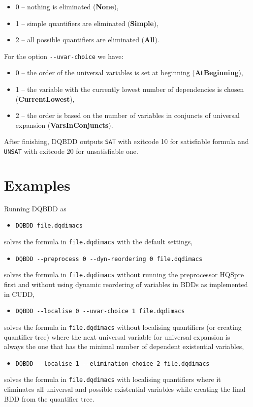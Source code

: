 \documentclass[
  digital, %
  color,
  twoside, %
  table,   %
  nolof,     %
  nolot,     %
]{fithesis3}
\theoremstyle{definition}
\theoremstyle{remark}
\newcommand{\QEnone}{\textbf{None}}
\newcommand{\QEsimple}{\textbf{Simple}}
\newcommand{\QEall}{\textbf{All}}
\newcommand{\QUatbeginning}{\textbf{At\-Be\-gin\-ning}}
\newcommand{\QUcurrentlowest}{\textbf{CurrentLowest}}
\newcommand{\QUvarsinconjuncts}{\textbf{VarsInConjuncts}}
\begin{document}
\begin{itemize}
    \item 0 -- nothing is eliminated (\QEnone{}),
    \item 1 -- simple quantifiers are eliminated (\QEsimple{}),
    \item 2 -- all possible quantifiers are eliminated (\QEall{}).
\end{itemize}
For the option \verb|--uvar-choice| we have:
\begin{itemize}
    \item 0 -- the order of the universal variables is set at beginning (\QUatbeginning{}),
    \item 1 -- the variable with the currently lowest number of dependencies is chosen (\QUcurrentlowest{}),
    \item 2 -- the order is based on the number of variables in conjuncts of universal expansion (\QUvarsinconjuncts{}).
\end{itemize}

After finishing, DQBDD outputs \verb|SAT| with exitcode 10 for satisfiable formula and \verb|UNSAT| with exitcode 20 for unsatisfiable one.

\section{Examples}
Running DQBDD as
\begin{itemize}
  \item \verb|DQBDD file.dqdimacs|
\end{itemize}
solves the formula in \verb|file.dqdimacs| with the default settings,
\begin{itemize}
  \item \verb|DQBDD --preprocess 0 --dyn-reordering 0 file.dqdimacs|
\end{itemize}
solves the formula in \verb|file.dqdimacs| without running the preprocessor HQSpre first and without using dynamic reordering of variables in BDDs as implemented in CUDD,
\begin{itemize}
  \item \verb|DQBDD --localise 0 --uvar-choice 1 file.dqdimacs|
\end{itemize}
solves the formula in \verb|file.dqdimacs| without localising quantifiers (or creating quantifier tree) where the next universal variable for universal expansion is always the one that has the minimal number of dependent existential variables,
\begin{itemize}
  \item \verb|DQBDD --localise 1 --elimination-choice 2 file.dqdimacs|
\end{itemize}
solves the formula in \verb|file.dqdimacs| with localising quantifiers where it eliminates all universal and possible existential variables while creating the final BDD from the quantifier tree.
\end{document}
